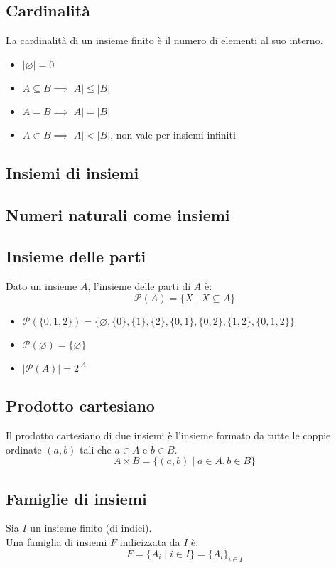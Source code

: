 \documentclass{article}
\begin{document}
\subsection{Cardinalità}
La cardinalità di un insieme finito è il numero di elementi al suo interno.
\begin{itemize}
    \item \(\lvert \varnothing \rvert = 0\)
    \item \(A \subseteq B \implies \lvert A \rvert \leq \lvert B \rvert\)
    \item \(A = B \implies \lvert A \rvert = \lvert B\rvert \)
    \item \(A \subset B \implies \lvert A \rvert < \lvert B \rvert\), non vale per insiemi infiniti
\end{itemize}

\subsection{Insiemi di insiemi}

\subsection{Numeri naturali come insiemi}

\subsection{Insieme delle parti}
Dato un insieme \(A\), l'insieme delle parti di \(A\) è:
\[\mathcal{P}(A) = \{X \mid X \subseteq A\}\]
\begin{itemize}
    \item \(\mathcal{P}(\{0,1,2\}) = \{\varnothing, \{0\}, \{1\}, \{2\}, \{0,1\}, \{0,2\}, \{1,2\}, \{0,1,2\}\}\)
    \item \(\mathcal{P}(\varnothing) = \{\varnothing\}\)
    \item \(\lvert\mathcal{P}(A)\rvert = 2^{\lvert A \rvert}\)
\end{itemize}

\subsection{Prodotto cartesiano}
Il prodotto cartesiano di due insiemi è l'insieme formato da tutte le coppie ordinate \((a,b)\) tali che \(a \in A\) e \(b \in B\).
\[A \times B = \{(a,b) \mid a \in A, b \in B\}\]

\subsection{Famiglie di insiemi}
Sia \(I\) un insieme finito (di indici).\\
Una famiglia di insiemi \(F\) indicizzata da \(I\) è:
\[F = \{A_i \mid i \in I\} = \{A_i\}_{i \in I}\]
\end{document}
